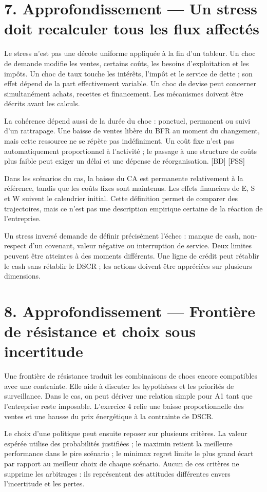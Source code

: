 \documentclass[12pt,a4paper]{article}
\begin{document}
\section*{7. Approfondissement --- Un stress doit recalculer tous les flux affectés}
Le stress n’est pas une décote uniforme appliquée à la fin d’un tableur. Un choc de demande modifie les ventes, certains coûts, les besoins d’exploitation et les impôts. Un choc de taux touche les intérêts, l’impôt et le service de dette ; son effet dépend de la part effectivement variable. Un choc de devise peut concerner simultanément achats, recettes et financement. Les mécanismes doivent être décrits avant les calculs.


La cohérence dépend aussi de la durée du choc : ponctuel, permanent ou suivi d’un rattrapage. Une baisse de ventes libère du BFR au moment du changement, mais cette ressource ne se répète pas indéfiniment. Un coût fixe n’est pas automatiquement proportionnel à l’activité ; le passage à une structure de coûts plus faible peut exiger un délai et une dépense de réorganisation. [BD] [FSS]


Dans les scénarios du cas, la baisse du CA est permanente relativement à la référence, tandis que les coûts fixes sont maintenus. Les effets financiers de E, S et W suivent le calendrier initial. Cette définition permet de comparer des trajectoires, mais ce n’est pas une description empirique certaine de la réaction de l’entreprise.


Un stress inversé demande de définir précisément l’échec : manque de cash, non-respect d’un covenant, valeur négative ou interruption de service. Deux limites peuvent être atteintes à des moments différents. Une ligne de crédit peut rétablir le cash sans rétablir le DSCR ; les actions doivent être appréciées sur plusieurs dimensions.

\section*{8. Approfondissement --- Frontière de résistance et choix sous incertitude}
Une frontière de résistance traduit les combinaisons de chocs encore compatibles avec une contrainte. Elle aide à discuter les hypothèses et les priorités de surveillance. Dans le cas, on peut dériver une relation simple pour A1 tant que l’entreprise reste imposable. L’exercice 4 relie une baisse proportionnelle des ventes et une hausse du prix énergétique à la contrainte de DSCR.


Le choix d’une politique peut ensuite reposer sur plusieurs critères. La valeur espérée utilise des probabilités justifiées ; le maximin retient la meilleure performance dans le pire scénario ; le minimax regret limite le plus grand écart par rapport au meilleur choix de chaque scénario. Aucun de ces critères ne supprime les arbitrages : ils représentent des attitudes différentes envers l’incertitude et les pertes.
\end{document}
